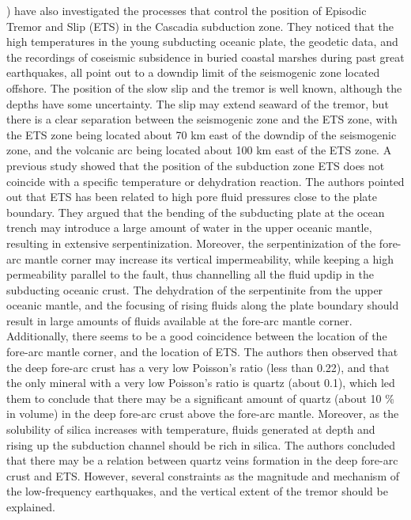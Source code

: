\documentclass[draft]{agujournal2019}
\begin{document}
) have also investigated the processes that control the position of Episodic Tremor and Slip (ETS) in the Cascadia subduction zone. They noticed that the high temperatures in the young subducting oceanic plate, the geodetic data, and the recordings of coseismic subsidence in buried coastal marshes during past great earthquakes, all point out to a downdip limit of the seismogenic zone located offshore. The position of the slow slip and the tremor is well known, although the depths have some uncertainty. The slip may extend seaward of the tremor, but there is a clear separation between the seismogenic zone and the ETS zone, with the ETS zone being located about 70 km east of the downdip of the seismogenic zone, and the volcanic arc being located about 100 km east of the ETS zone. A previous study showed that the position of the subduction zone ETS does not coincide with a specific temperature or dehydration reaction. The authors pointed out that ETS has been related to high pore fluid pressures close to the plate boundary. They argued that the bending of the subducting plate at the ocean trench may introduce a large amount of water in the upper oceanic mantle, resulting in extensive serpentinization. Moreover, the serpentinization of the fore-arc mantle corner may increase its vertical impermeability, while keeping a high permeability parallel to the fault, thus channelling all the fluid updip in the subducting oceanic crust. The dehydration of the serpentinite from the upper oceanic mantle, and the focusing of rising fluids along the plate boundary should result in large amounts of fluids available at the fore-arc mantle corner. Additionally, there seems to be a good coincidence between the location of the fore-arc mantle corner, and the location of ETS. The authors then observed that the deep fore-arc crust has a very low Poisson's ratio (less than 0.22), and that the only mineral with a very low Poisson's ratio is quartz (about 0.1), which led them to conclude that there may be a significant amount of quartz (about 10 \% in volume) in the deep fore-arc crust above the fore-arc mantle. Moreover, as the solubility of silica increases with temperature, fluids generated at depth and rising up the subduction channel should be rich in silica. The authors concluded that there may be a relation between quartz veins formation in the deep fore-arc crust and ETS. However, several constraints as the magnitude and mechanism of the low-frequency earthquakes, and the vertical extent of the tremor should be explained. \\
\end{document}
